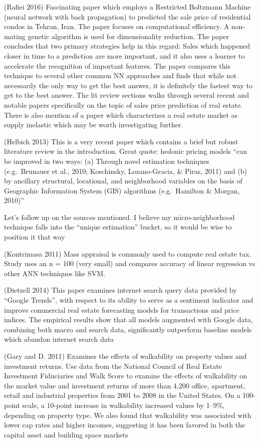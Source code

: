 \documentclass[]{article}
\begin{document}
(Rafiei 2016) Fascinating paper which employs a Restricted Boltzmann
Machine (neural network with back propagation) to predicted the sale
price of residential condos in Tehran, Iran. The paper focuses on
computational efficiency. A non-mating genetic algorithm is used for
dimensionality reduction. The paper concludes that two primary
strategies help in this regard: Sales which happened closer in time to a
prediction are more important, and it also uses a learner to accelerate
the recognition of important features. The paper compares this technique
to several other common NN approaches and finds that while not
necessarily the only way to get the best answer, it is definitely the
fastest way to get to the best answer. The lit review sections walks
through several recent and notable papers specifically on the topic of
sales price prediction of real estate. There is also mention of a paper
which characterizes a real estate market as supply inelastic which may
be worth investigating further.

(Helbich 2013) This is a very recent paper which contains a brief but
robust literature review in the introduction. Great quote: hedonic
pricing models ``can be improved in two ways: (a) Through novel
estimation techniques (e.g.~Brunauer et al., 2010; Koschinsky,
Lozano-Gracia, \& Piras, 2011) and (b) by ancillary structural,
locational, and neighborhood variables on the basis of Geographic
Information System (GIS) algorithms (e.g.~Hamilton \& Morgan, 2010)''

Let's follow up on the sources mentioned. I believe my
micro-neighborhood technique falls into the ``unique estimation''
bucket, so it would be wise to position it that way

(Kontrimasa 2011) Mass appraisal is commonly used to compute real estate
tax. Study uses an n = 100 (very small) and compares accuracy of linear
regression vs other ANN techniques like SVM.

(Dietzell 2014) This paper examines internet search query data provided
by ``Google Trends'', with respect to its ability to serve as a
sentiment indicator and improve commercial real estate forecasting
models for transactions and price indices. The empirical results show
that all models augmented with Google data, combining both macro and
search data, significantly outperform baseline models which abandon
internet search data

(Gary and D. 2011) Examines the effects of walkability on property
values and investment returns. Use data from the National Council of
Real Estate Investment Fiduciaries and Walk Score to examine the effects
of walkability on the market value and investment returns of more than
4,200 office, apartment, retail and industrial properties from 2001 to
2008 in the United States. On a 100-point scale, a 10-point increase in
walkability increased values by 1--9\%, depending on property type. We
also found that walkability was associated with lower cap rates and
higher incomes, suggesting it has been favored in both the capital asset
and building space markets
\end{document}

